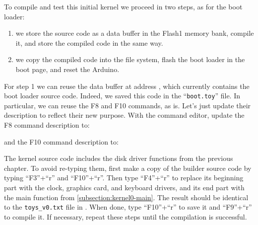 To compile and test this initial kernel we proceed in two steps, as for the
boot loader:
\begin{enumerate}
  \item we store the source code as a data buffer in the Flash1 memory bank,
  compile it, and store the compiled code in the same way.

  \item we copy the compiled code into the file system, flash the boot loader
  in the boot page, and reset the Arduino.
\end{enumerate}

For step 1 we can reuse the data buffer at address ,
which currently contains the boot loader source code. Indeed, we saved this
code in the ``{\tt boot.toy}'' file. In particular, we can reuse the F8 and F10
commands, as is. Let's just update their description to reflect their new
purpose. With the command editor, update the F8 command description to:


\noindent and the F10 command description to:


The kernel source code includes the disk driver functions from the previous
chapter. To avoid re-typing them, first make a copy of the builder source code
by typing ``F3''+``r'' and ``F10''+``r''. Then type ``F4''+``r'' to replace its
beginning part with the clock, graphics card, and keyboard drivers, and its end
part with the main function from \cref{subsection:kernel0-main}. The result
should be identical to the {\tt toys\_v0.txt} file in .
When done, type ``F10''+``r'' to save it and ``F9''+``r'' to compile it. If
necessary, repeat these steps until the compilation is successful.


